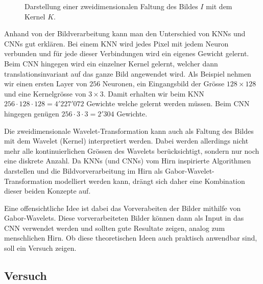 \begin{figure}
	\centering
	
	\caption{Darstellung einer zweidimensionalen Faltung des Bildes $I$ mit dem Kernel $K$.}
	\label{fig:2dconv}
\end{figure}

Anhand von der Bildverarbeitung kann man den Unterschied von KNNs und CNNs gut erklären.
Bei einem KNN wird jedes Pixel mit jedem Neuron verbunden und für jede dieser Verbindungen wird ein eigenes Gewicht gelernt.
Beim CNN hingegen wird ein einzelner Kernel gelernt, welcher dann translationsinvariant auf das ganze Bild angewendet wird.
Als Beispiel nehmen wir einen ersten Layer von $256$ Neuronen, ein Eingangsbild der Grösse $128\times128$ und eine Kernelgrösse von $3\times3$.
Damit erhalten wir beim KNN	$256 \cdot 128 \cdot 128 = 4'227'072$ Gewichte welche gelernt werden müssen.
Beim CNN hingegen genügen $256 \cdot 3 \cdot 3 = 2'304$ Gewichte.

Die zweidimensionale Wavelet-Transformation kann auch als Faltung des Bildes mit dem Wavelet (Kernel) interpretiert werden.
Dabei werden allerdings nicht mehr alle kontinuierlichen Grössen des Wavelets berücksichtigt, sondern nur noch eine diskrete Anzahl.
Da KNNs (und CNNs) vom Hirn inspirierte Algorithmen darstellen und die Bildvorverarbeitung im Hirn als Gabor-Wavelet-Transformation modelliert werden kann, drängt sich daher eine Kombination dieser beiden Konzepte auf.

Eine offensichtliche Idee ist dabei das Vorverabeiten der Bilder mithilfe von Gabor-Wavelets.
Diese vorverarbeiteten Bilder können dann als Input in das CNN verwendet werden und sollten gute Resultate zeigen, analog zum menschlichen Hirn.
Ob diese theoretischen Ideen auch praktisch anwendbar sind, soll ein Versuch zeigen.

\subsection{Versuch}


